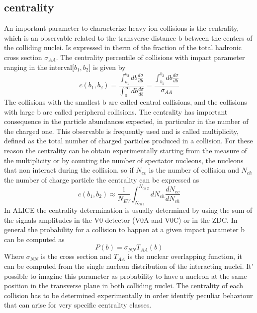 \documentclass[12pt,a4paper]{book}
\begin{document}
	\subsection{centrality}
	An important parameter to characterize heavy-ion collisions is the centrality, which is an
	observable related to the transverse distance b between the centers of the colliding nuclei. Is expressed in therm of the fraction of the total hadronic cross section $\sigma_{AA}$. The centrality percentile of collisions with impact parameter ranging in the interval[$b_1,b_2$] is given by
	\begin{equation}
		c(b_1,b_2)=\frac{\int_{b_1}^{b_2} db \frac{d\sigma}{db}}{\int_{0}^{\infty} db \frac{d\sigma}{db}} = \frac{\int_{b_1}^{b_2} db \frac{d\sigma}{db}}{\sigma_{AA}}
		\label{eq:centrrality1}
	\end{equation}
	The collisions with the smallest b are
	called central collisions, and the collisions with large b are called peripheral collisions. The centrality has important consequence in the particle abundances expected, in particular in the number of the charged one. This observable is frequently used and is called multiplicity, defined as the total number of charged particles produced in a collision. For these reason the centrality can be obtain experimentally starting from the measure of the multiplicity or by counting the number of spectator nucleons, the nucleons that non interact during the collision. so if $N_{ev}$ is the number of collision and $N_{ch}$ the number of charge particle the centrality can be expressed as
	\begin{equation}
		c(b_1,b_2) \approx \frac{1}{N_{EV}} \int_{N_{ch \ 1}}^{N_{ch \ 2}} dN_{ch} \frac{dN_{ev}}{dN_{ch}}
		\label{eq:centrrality2}
	\end{equation}
	In ALICE the centrality determination is usually determined by using the sum of the signals amplitudes in the V0 detector (V0A and V0C) or in the ZDC. In general the probability for a collision to happen at a given impact parameter b can be computed as
	\begin{equation}
		P(b)= \sigma_{NN} T_{AA}(b)
		\label{eq:prob_collision}
	\end{equation}
	Where $\sigma_{NN}$ is the cross section and $T_{AA}$ is the nuclear overlapping function, it can be computed from the single nucleon distribution of the interacting nuclei. It' possible to imagine this parameter as probability to have a nucleon at the same position in the transverse plane in both colliding nuclei. The centrality of each collision has to be determined experimentally in order identify	peculiar behaviour that can arise for very specific centrality classes. \cite{amsdottorato9036}
	
\end{document}
